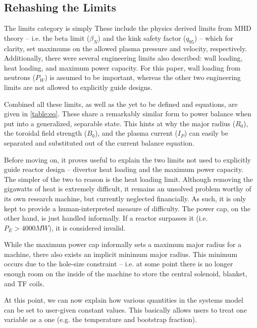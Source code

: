 \subsection{Rehashing the Limits}

The limits category is simply  These include the physics derived limits from MHD theory -- i.e. the beta limit ($\beta_N$) and the kink safety factor ($q_{95}$) -- which for clarity, set maximums on the allowed plasma pressure and velocity, respectively. Additionally, there were several engineering limits also described: wall loading, heat loading, and maximum power capacity. For this paper, wall loading from neutrons ($P_W$) is assumed to be important, whereas the other two engineering limits are not allowed to explicitly guide designs.

Combined all these limits, as well as the yet to be defined  and  equations, are given in \cref{table:eq}. These share a remarkably similar form to power balance when put into a generalized, separable state. This hints at why the major radius ($R_0$), the toroidal field strength ($B_0$), and the plasma current ($I_P$) can easily be separated and substituted out of the current balance equation.

Before moving on, it proves useful to explain the two limits not used to explicitly guide reactor design -- divertor heat loading and the maximum power capacity. The simpler of the two to reason is the heat loading limit. Although removing the gigawatts of heat is extremely difficult, it remains an unsolved problem worthy of its own research machine, but currently neglected financially. As such, it is only kept to provide a human-interpreted  measure of difficulty. The power cap, on the other hand, is just handled informally. If a reactor surpasses it (i.e. $ P_E > 4000 MW $), it is considered invalid.

While the maximum power cap informally sets a maximum major radius for a machine, there also exists an implicit minimum major radius. This minimum occurs due to the hole-size constraint -- i.e. at some point there is no longer enough room on the inside of the machine to store the central solenoid, blanket, and TF coils.

At this point, we can now explain how various quantities in the systems model can be set to user-given constant values. This basically allows users to treat one  variable as a  one (e.g. the temperature and bootstrap fraction).

